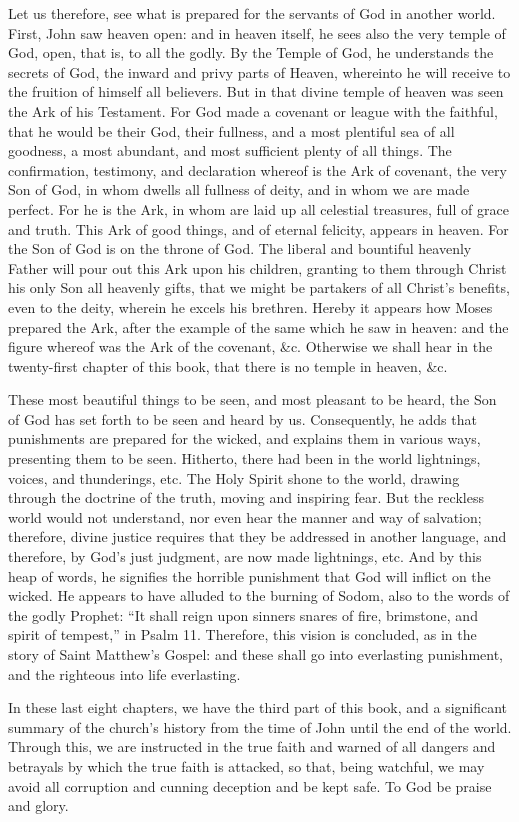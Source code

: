 Let us therefore, see what is prepared for the servants of God in another world. First, John saw heaven open: and in heaven itself, he sees also the very temple of God, open, that is, to all the godly. By the Temple of God, he understands the secrets of God, the inward and privy parts of Heaven, whereinto he will receive to the fruition of himself all believers. But in that divine temple of heaven was seen the Ark of his Testament. For God made a covenant or league with the faithful, that he would be their God, their fullness, and a most plentiful sea of all goodness, a most abundant, and most sufficient plenty of all things. The confirmation, testimony, and declaration whereof is the Ark of covenant, the very Son of God, in whom dwells all fullness of deity, and in whom we are made perfect. For he is the Ark, in whom are laid up all celestial treasures, full of grace and truth. This Ark of good things, and of eternal felicity, appears in heaven. For the Son of God is on the throne of God. The liberal and bountiful heavenly Father will pour out this Ark upon his children, granting to them through Christ his only Son all heavenly gifts, that we might be partakers of all Christ’s benefits, even to the deity, wherein he excels his brethren. Hereby it appears how Moses prepared the Ark, after the example of the same which he saw in heaven: and the figure whereof was the Ark of the covenant, \&c. Otherwise we shall hear in the twenty-first chapter of this book, that there is no temple in heaven, \&c.

These most beautiful things to be seen, and most pleasant to be heard, the Son of God has set forth to be seen and heard by us. Consequently, he adds that punishments are prepared for the wicked, and explains them in various ways, presenting them to be seen. Hitherto, there had been in the world lightnings, voices, and thunderings, etc. The Holy Spirit shone to the world, drawing through the doctrine of the truth, moving and inspiring fear. But the reckless world would not understand, nor even hear the manner and way of salvation; therefore, divine justice requires that they be addressed in another language, and therefore, by God’s just judgment, are now made lightnings, etc. And by this heap of words, he signifies the horrible punishment that God will inflict on the wicked. He appears to have alluded to the burning of Sodom, also to the words of the godly Prophet: “It shall reign upon sinners snares of fire, brimstone, and spirit of tempest,” in Psalm 11. Therefore, this vision is concluded, as in the story of Saint Matthew’s Gospel: and these shall go into everlasting punishment, and the righteous into life everlasting.

In these last eight chapters, we have the third part of this book, and a significant summary of the church’s history from the time of John until the end of the world. Through this, we are instructed in the true faith and warned of all dangers and betrayals by which the true faith is attacked, so that, being watchful, we may avoid all corruption and cunning deception and be kept safe. To God be praise and glory.
